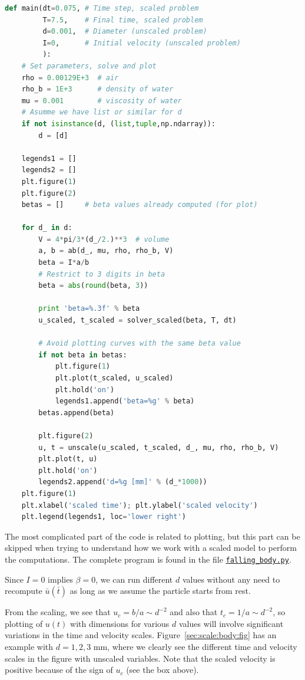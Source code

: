 \documentclass[graybox,envcountchap,sectrefs,final]{svmonodo}
\begin{document}
\begin{lstlisting}[language=Python,style=graycolor]
def main(dt=0.075, # Time step, scaled problem
         T=7.5,    # Final time, scaled problem
         d=0.001,  # Diameter (unscaled problem)
         I=0,      # Initial velocity (unscaled problem)
         ):
    # Set parameters, solve and plot
    rho = 0.00129E+3  # air
    rho_b = 1E+3      # density of water
    mu = 0.001        # viscosity of water
    # Asumme we have list or similar for d
    if not isinstance(d, (list,tuple,np.ndarray)):
        d = [d]

    legends1 = []
    legends2 = []
    plt.figure(1)
    plt.figure(2)
    betas = []     # beta values already computed (for plot)

    for d_ in d:
        V = 4*pi/3*(d_/2.)**3  # volume
        a, b = ab(d_, mu, rho, rho_b, V)
        beta = I*a/b
        # Restrict to 3 digits in beta
        beta = abs(round(beta, 3))

        print 'beta=%.3f' % beta
        u_scaled, t_scaled = solver_scaled(beta, T, dt)

        # Avoid plotting curves with the same beta value
        if not beta in betas:
            plt.figure(1)
            plt.plot(t_scaled, u_scaled)
            plt.hold('on')
            legends1.append('beta=%g' % beta)
        betas.append(beta)

        plt.figure(2)
        u, t = unscale(u_scaled, t_scaled, d_, mu, rho, rho_b, V)
        plt.plot(t, u)
        plt.hold('on')
        legends2.append('d=%g [mm]' % (d_*1000))
    plt.figure(1)
    plt.xlabel('scaled time'); plt.ylabel('scaled velocity')
    plt.legend(legends1, loc='lower right')
\end{lstlisting}
The most complicated part of the code is related to plotting, but
this part can be skipped when trying to understand how we work with
a scaled model to perform the computations.
The complete program is found in the file
\href{{http://tinyurl.com/o8pb3yy/falling_body.py}}{\nolinkurl{falling_body.py}}.

Since $I=0$ implies $\beta=0$, we can run different $d$ values without
any need to recompute $\bar u(\bar t)$ as long as we assume the particle
starts from rest.

From the scaling, we see that $u_c = b/a\sim d^{-2}$ and
also that $t_c=1/a \sim d^{-2}$, so plotting of $u(t)$ with dimensions
for various $d$ values will involve significant variations in the time
and velocity scales. Figure~\ref{sec:scale:body:fig}
has an example with $d=1,2,3$ mm, where we clearly see the different
time and velocity scales in the figure with unscaled variables.
Note that the scaled velocity is positive because of the sign of $u_c$
(see the box above).
\end{document}
